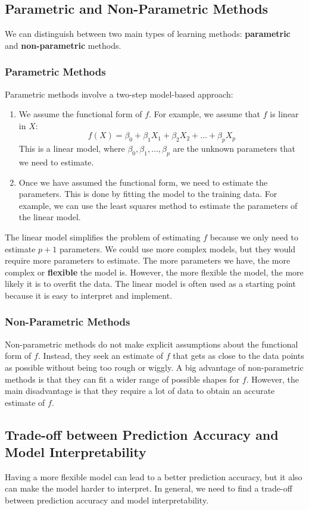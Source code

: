 \subsection*{Parametric and Non-Parametric Methods}
We can distinguish between two main types of learning methods: \textbf{parametric} and \textbf{non-parametric} methods.
\subsubsection*{Parametric Methods}
Parametric methods involve a two-step model-based approach:
\begin{enumerate}
    \item We assume the functional form of $f$. For example, we assume that $f$ is linear in $X$:
          \[
              f(X) = \beta_0 + \beta_1 X_1 + \beta_2 X_2 + \dots + \beta_p X_p
          \]
          This is a linear model, where $\beta_0, \beta_1, \dots, \beta_p$ are the unknown parameters that we need to estimate.
    \item Once we have assumed the functional form, we need to estimate the parameters. This is done by fitting the model to the training data. For example, we can use the least squares method to estimate the parameters of the linear model.
\end{enumerate}

The linear model simplifies the problem of estimating $f$ because we only need to estimate $p+1$ parameters. We could use more complex models, but they would require more parameters to estimate. The more parameters we have, the more complex or \textbf{flexible} the model is. However, the more flexible the model, the more likely it is to overfit the data. The linear model is often used as a starting point because it is easy to interpret and implement. 

\subsubsection*{Non-Parametric Methods}
Non-parametric methods do not make explicit assumptions about the functional form of $f$. Instead, they seek an estimate of $f$ that gets as close to the data points as possible without being too rough or wiggly. A big advantage of non-parametric methods is that they can fit a wider range of possible shapes for $f$. However, the main disadvantage is that they require a lot of data to obtain an accurate estimate of $f$.

\subsection*{Trade-off between Prediction Accuracy and Model Interpretability}
Having a more flexible model can lead to a better prediction accuracy, but it also can make the model harder to interpret. In general, we need to find a trade-off between prediction accuracy and model interpretability.

